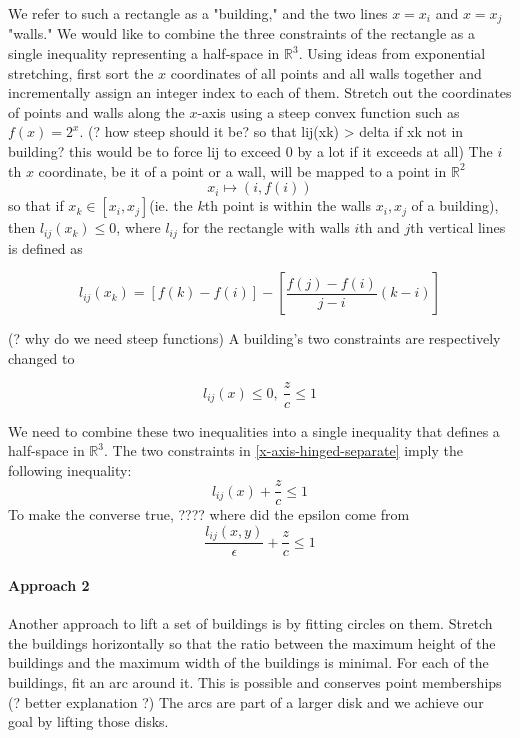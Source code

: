 \documentclass{NSF}
\begin{document}
We refer to such a rectangle as a "building," and the two lines $x=x_i$ and $x=x_j$ "walls."
We would like to combine the three constraints of the rectangle as a single inequality representing a half-space in $\mathbb{R}^3$.
Using ideas from exponential stretching, first sort the $x$ coordinates of all points and all walls together and incrementally assign an integer index to each of them. Stretch out the coordinates of points and walls along the $x$-axis using a steep convex function such as $f(x)=2^x$. 
(? how steep should it be? so that lij(xk) > delta if xk not in building? this would be to force lij to exceed 0 by a lot if it exceeds at all)
The $i$th $x$ coordinate, be it of a point or a wall, will be mapped to a point in $\mathbb{R}^2$
\begin{equation}
	x_i \mapsto (i, f(i))
\end{equation}
so that if $x_k \in [x_i,x_j]$(ie. the $k$th point is within the walls $x_i,x_j$ of a building), then $l_{ij}(x_k) \leq 0 $, where $l_{ij}$ for the rectangle with walls  $i$th and $j$th vertical lines is defined as

\begin{equation*}
    l_{ij}(x_k) = [f(k) - f(i)] -[\frac{f(j)-f(i)}{j-i}(k - i)]
\end{equation*}


(? why do we need steep functions)
A building's two constraints are respectively changed to 

\begin{equation}\label{x-axis-hinged-separate}
    l_{ij}(x) \leq 0, \ \frac{z}{c} \leq 1
\end{equation}


We need to combine these two inequalities into a single inequality that defines a half-space in $\mathbb{R}^3$. 
The two constraints in \eqref{x-axis-hinged-separate} imply the following inequality:
\begin{equation}\label{x-axis-hinged-added}
    l_{ij}(x) + \frac{z}{c} \leq 1 
\end{equation}
To make the converse true, ???? where did the epsilon come from
\begin{equation}
	\frac{l_{ij}(x,y)}{\epsilon} + \frac{z}{c} \leq 1
\end{equation}
\paragraph{Approach 2}
Another approach to lift a set of buildings is by fitting circles on them. Stretch the buildings horizontally so that the ratio between the maximum height of the buildings and the maximum width of the buildings is minimal. For each of the buildings, fit an arc around it. This is possible and conserves point memberships (? better explanation ?) The arcs are part of a larger disk and we achieve our goal by lifting those disks.
\end{document}
